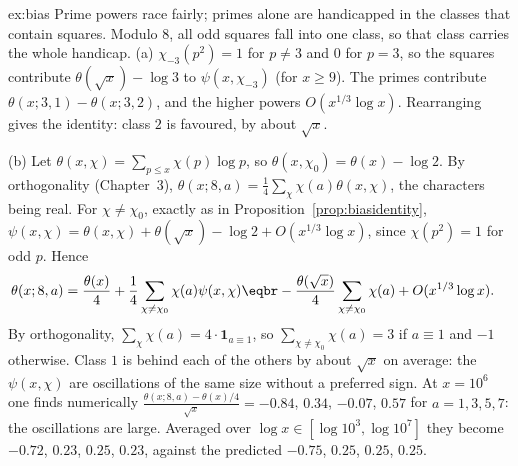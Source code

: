 \begin{solution}{ex:bias}
\idea Prime powers race fairly; primes alone are handicapped in the classes that contain squares. Modulo $8$, all odd squares fall into one class, so that class carries the whole handicap.
\writeup (a) $\chi_{-3}(p^2)=1$ for $p\ne3$ and $0$ for $p=3$, so the squares contribute $\theta(\sqrt x)-\log3$ to $\psi(x,\chi_{-3})$ (for $x\ge9$). The primes contribute $\theta(x;3,1)-\theta(x;3,2)$, and the
higher powers $O(x^{1/3}\log x)$. Rearranging gives the identity: class $2$ is favoured, by about $\sqrt x$.

(b) Let $\theta(x,\chi)=\sum_{p\le x}\chi(p)\log p$, so $\theta(x,\chi_0)=\theta(x)-\log2$. By orthogonality (Chapter~3), $\theta(x;8,a)=\frac14\sum_\chi\chi(a)\theta(x,\chi)$, the characters being real. For
$\chi\ne\chi_0$, exactly as in Proposition~\ref{prop:biasidentity}, $\psi(x,\chi)=\theta(x,\chi)+\theta(\sqrt x)-\log2+O(x^{1/3}\log x)$, since $\chi(p^2)=1$ for odd $p$. Hence
\[
\begin{aligned}\theta(x;8,a)&=\frac{\theta(x)}4+\frac14\sum_{\chi\ne\chi_0}\chi(a)\psi(x,\chi)\eqbr-\frac{\theta(\sqrt x)}4\sum_{\chi\ne\chi_0}\chi(a)+O(x^{1/3}\log x).\end{aligned}
\]
By orthogonality, $\sum_\chi\chi(a)=4\cdot\mathbf1_{a\equiv1}$, so $\sum_{\chi\ne\chi_0}\chi(a)=3$ if $a\equiv1$ and $-1$ otherwise. Class $1$ is behind each of the others by about $\sqrt x$ on average: the $\psi(x,\chi)$ are
oscillations of the same size without a preferred sign. At $x=10^6$ one finds numerically $\frac{\theta(x;8,a)-\theta(x)/4}{\sqrt x}=-0.84$, $0.34$, $-0.07$, $0.57$ for $a=1,3,5,7$: the oscillations are large. Averaged over $\log x\in[\log10^3,\log10^7]$ they
become $-0.72$, $0.23$, $0.25$, $0.23$, against the predicted $-0.75$, $0.25$, $0.25$, $0.25$.
\end{solution}


